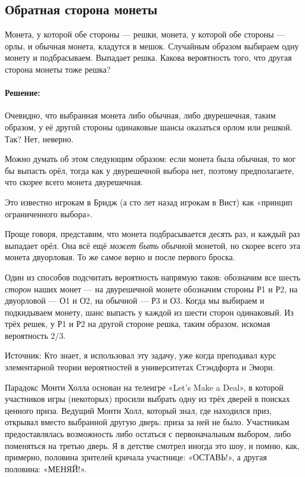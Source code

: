 \subsection*{Обратная сторона монеты}%

Монета, у которой обе стороны --- решки, монета, у которой обе стороны --- орлы, и обычная монета, кладутся в мешок.
Случайным образом выбираем одну монету и подбрасываем.
Выпадает решка.
Какова вероятность того, что другая сторона монеты тоже решка?

\paragraph{Решение:}
Очевидно, что выбранная монета либо обычная, либо двурешечная, таким образом, у её другой стороны одинаковые шансы оказаться орлом или решкой.
Так?
Нет, неверно.

Можно думать об этом следующим образом: если монета была обычная, то мог бы выпасть орёл, тогда как у двурешечной выбора нет, поэтому предполагаете, что скорее всего монета двурешечная.

Это известно игрокам в Бридж (а сто лет назад игрокам в Вист) как «принцип ограниченного выбора».

Проще говоря, представим, что монета подбрасывается десять раз, и каждый раз выпадает орёл.
Она всё ещё \emph{может быть} обычной монетой, но скорее всего эта монета двуорловая.
То же самое верно и после первого броска.

Один из способов подсчитать вероятность напрямую таков:
обозначим все шесть \emph{сторон} наших монет ---
на двурешечной монете обозначим стороны Р1 и Р2, на двуорловой --- О1 и О2, на обычной --- Р3 и О3.
Когда мы выбираем и подкидываем монету, шанс выпасть у каждой из шести сторон одинаковый.
Из трёх решек, у Р1 и Р2 на другой стороне решка, таким образом, искомая вероятность $2/3$.\heart

Источник: Кто знает, я использовал эту задачу, уже когда преподавал курс элементарной теории вероятностей в университетах Стэндфорта и Эмори.

\medskip

Парадокс Монти Холла основан на телеигре «Let’s Make a Deal», в которой участников игры (некоторых) просили выбрать одну из трёх дверей в поисках ценного приза.
Ведущий Монти Холл, который знал, где находился приз, открывал вместо выбранной другую дверь: приза за ней не было.
Участникам предоставлялась возможность либо остаться с первоначальным выбором, либо поменяться на третью дверь.
Я в детстве смотрел иногда это шоу, и помню, как, примерно, половина зрителей кричала участнице: «ОСТАВЬ!», а другая половина: «МЕНЯЙ!».

